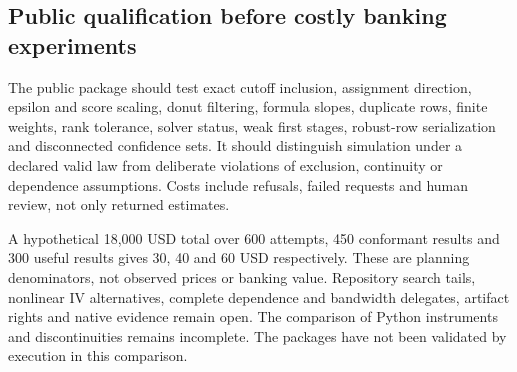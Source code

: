 \subsection{Public qualification before costly banking experiments}
The public package should test exact cutoff inclusion, assignment direction,
epsilon and score scaling, donut filtering, formula slopes, duplicate rows,
finite weights, rank tolerance, solver status, weak first stages, robust-row
serialization and disconnected confidence sets. It should distinguish
simulation under a declared valid law from deliberate violations of
exclusion, continuity or dependence assumptions. Costs include refusals,
failed requests and human review, not only returned estimates.
\citep{exec25_pyrdiv_choice}

A hypothetical 18,000 USD total over 600 attempts, 450 conformant results
and 300 useful results gives 30, 40 and 60 USD respectively. These are
planning denominators, not observed prices or banking value. Repository
search tails, nonlinear IV alternatives, complete dependence and
bandwidth delegates, artifact rights and native evidence remain open.
The comparison of Python instruments and discontinuities remains incomplete.
The packages have not been validated by execution in this comparison.
\citep{exec25_pyrdiv_choice}
